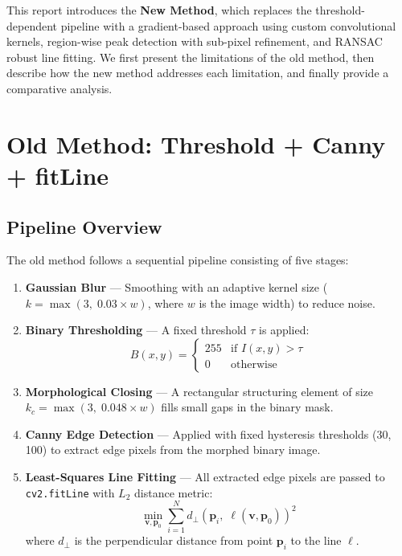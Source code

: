 \documentclass[12pt, a4paper]{article}
\begin{document}
This report introduces the \textbf{New Method}, which replaces the threshold-dependent pipeline with a gradient-based approach using custom convolutional kernels, region-wise peak detection with sub-pixel refinement, and RANSAC robust line fitting. We first present the limitations of the old method, then describe how the new method addresses each limitation, and finally provide a comparative analysis.

\section{Old Method: Threshold + Canny + fitLine}

\subsection{Pipeline Overview}

The old method follows a sequential pipeline consisting of five stages:

\begin{enumerate}[leftmargin=2cm]
    \item \textbf{Gaussian Blur} — Smoothing with an adaptive kernel size ($k = \max(3,\; 0.03 \times w)$, where $w$ is the image width) to reduce noise.
    \item \textbf{Binary Thresholding} — A fixed threshold $\tau$ is applied:
    \begin{equation}
        B(x,y) = \begin{cases} 255 & \text{if } I(x,y) > \tau \\ 0 & \text{otherwise} \end{cases}
    \end{equation}
    \item \textbf{Morphological Closing} — A rectangular structuring element of size $k_c = \max(3,\; 0.048 \times w)$ fills small gaps in the binary mask.
    \item \textbf{Canny Edge Detection} — Applied with fixed hysteresis thresholds (30, 100) to extract edge pixels from the morphed binary image.
    \item \textbf{Least-Squares Line Fitting} — All extracted edge pixels are passed to \texttt{cv2.fitLine} with $L_2$ distance metric:
    \begin{equation}
        \min_{\mathbf{v}, \mathbf{p}_0} \sum_{i=1}^{N} d_\perp(\mathbf{p}_i,\; \ell(\mathbf{v}, \mathbf{p}_0))^2
    \end{equation}
    where $d_\perp$ is the perpendicular distance from point $\mathbf{p}_i$ to the line $\ell$.
\end{enumerate}
\end{document}
